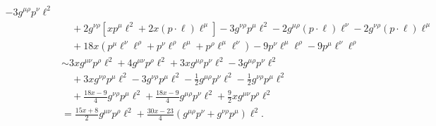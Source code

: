 \begin{align*}
  - 3 g^{\mu\rho} p^{\nu} \ell^2
  \\ & \quad
  + 2 g^{\nu\rho} [xp^\mu\ell^2 + 2x (p \cdot\ell) \ell^\mu]
  - 3g^{\nu\rho} p^{\mu} \ell^2
  - 2 g^{\mu\rho} (p \cdot\ell) \ell^{\nu}
  - 2 g^{\nu\rho} (p \cdot\ell) \ell^{\mu}
  \\ & \quad
  + 18x (p^\mu \ell^\nu\ell^\rho + p^\nu \ell^\rho\ell^\mu + p^\rho \ell^\mu\ell^\nu)
  - 9 p^{\nu} \ell^{\mu} \ell^{\rho}
  - 9 p^{\mu} \ell^{\nu} \ell^{\rho}
  \\
  &\sim
  3x g^{\mu\nu} p^\rho \ell^2
  + 4 g^{\mu\nu} p^{\rho} \ell^2
  + 3x g^{\mu\rho} p^\nu\ell^2
  - 3 g^{\mu\rho} p^{\nu} \ell^2
  \\ & \quad
  + 3x g^{\nu\rho} p^\mu \ell^2
  - 3g^{\nu\rho} p^{\mu} \ell^2
  - \frac{1}{2} g^{\mu\rho} p^\nu \ell^2
  - \frac{1}{2} g^{\nu\rho} p^\mu \ell^2
  \\ & \quad
  + \frac{18x-9}{4} g^{\nu\rho} p^\mu \ell^2 + \frac{18x-9}{4} g^{\mu\rho} p^\nu \ell^2 + \frac{9}{2} x g^{\mu\nu} p^\rho \ell^2
  \\
  &= \frac{15x+8}{2} g^{\mu\nu} p^\rho \ell^2 + \frac{30x-23}{4} (g^{\mu\rho} p^\nu + g^{\nu\rho} p^\mu) \ell^2 .
\end{align*}

